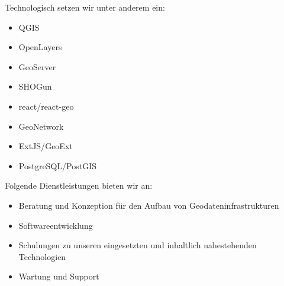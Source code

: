 \noindent Technologisch setzen wir unter anderem ein:
\vspace{-0.5\baselineskip}
\begin{multicols}{2}
  \RaggedRight
\begin{itemize}
  \setlength{\itemsep}{-0.2\baselineskip}
\item QGIS
\item OpenLayers
\item GeoServer
\item SHOGun
\item react/react-geo
\item GeoNetwork
\item ExtJS/GeoExt
\item PostgreSQL/PostGIS
\end{itemize}
\end{multicols}
\vspace{-0.5\baselineskip}

\noindent Folgende Dienstleistungen bieten wir an:
\begin{itemize}
  \setlength{\itemsep}{-0.2\baselineskip}
  \item Beratung und Konzeption für den Aufbau von Geodateninfrastrukturen
  \item Softwareentwicklung
  \item Schulungen zu unseren eingesetzten und inhaltlich nahestehenden Technologien
  \item Wartung und Support 
\end{itemize}
